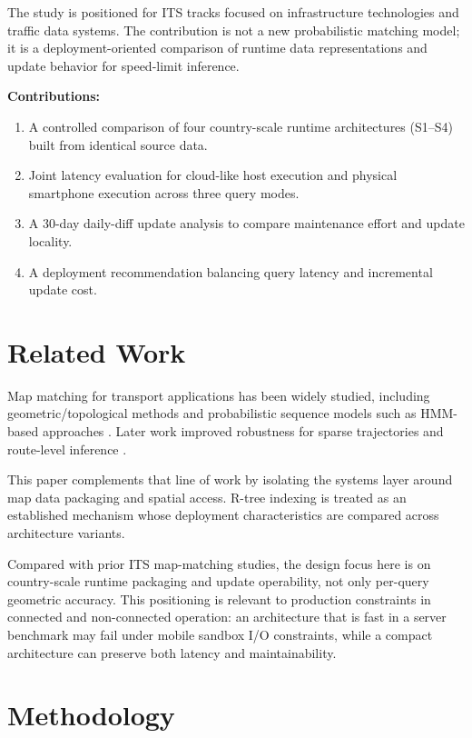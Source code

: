 \documentclass[conference]{IEEEtran}
\begin{document}
The study is positioned for ITS tracks focused on infrastructure technologies and traffic data systems. The contribution is not a new probabilistic matching model; it is a deployment-oriented comparison of runtime data representations and update behavior for speed-limit inference.

\textbf{Contributions:}
\begin{enumerate}
\item A controlled comparison of four country-scale runtime architectures (S1--S4) built from identical source data.
\item Joint latency evaluation for cloud-like host execution and physical smartphone execution across three query modes.
\item A 30-day daily-diff update analysis to compare maintenance effort and update locality.
\item A deployment recommendation balancing query latency and incremental update cost.
\end{enumerate}

\section{Related Work}
Map matching for transport applications has been widely studied, including geometric/topological methods \cite{quddus2007} and probabilistic sequence models such as HMM-based approaches \cite{newson2009,lou2009,goh2012,he2013}. Later work improved robustness for sparse trajectories and route-level inference \cite{rahmani2013,hunter2014,quddus2015,jagadeesh2017,che2018}.

This paper complements that line of work by isolating the systems layer around map data packaging and spatial access. R-tree indexing \cite{guttman1984} is treated as an established mechanism whose deployment characteristics are compared across architecture variants.

Compared with prior ITS map-matching studies, the design focus here is on country-scale runtime packaging and update operability, not only per-query geometric accuracy. This positioning is relevant to production constraints in connected and non-connected operation: an architecture that is fast in a server benchmark may fail under mobile sandbox I/O constraints, while a compact architecture can preserve both latency and maintainability.

\section{Methodology}
\end{document}

